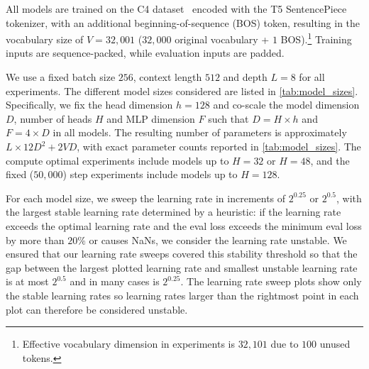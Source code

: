 All models are trained on the C4 dataset~\citep{t5} encoded with the T5 SentencePiece~\citep{kudo2018sentencepiece} tokenizer, with an additional beginning-of-sequence (BOS) token, resulting in the vocabulary size of $V = 32,001$ ($32,000$ original vocabulary + $1$ BOS).\footnote{Effective vocabulary dimension in experiments is $32,101$ due to $100$ unused tokens.} Training inputs are sequence-packed, while evaluation inputs are padded.

We use a fixed batch size $256$, context length $512$ and depth $L=8$ for all experiments. The different model sizes considered are listed in \cref{tab:model_sizes}. Specifically, we fix the head dimension $h=128$ and co-scale the model dimension $D$, number of heads $H$ and MLP dimension $F$ such that $D = H \times h$ and $F = 4 \times D$ in all models. The resulting number of parameters is approximately $L\times 12 D^2 + 2 V D$, with exact parameter counts reported in \cref{tab:model_sizes}. The compute optimal experiments include models up to $H=32$ or $H=48$, and the fixed ($50{,}000$) step experiments include models up to $H=128$.

For each model size, we sweep the learning rate in increments of $2^{0.25}$ or $2^{0.5}$, with the largest stable learning rate determined by a heuristic: if the learning rate exceeds the optimal learning rate and the eval loss exceeds the minimum eval loss by more than $20\%$ or causes NaNs, we consider the learning rate unstable. We ensured that our learning rate sweeps covered this stability threshold so that the gap between the largest plotted learning rate and smallest unstable learning rate is at most $2^{0.5}$ and in many cases is $2^{0.25}$. The learning rate sweep plots show only the stable learning rates so learning rates larger than the rightmost point in each plot can therefore be considered unstable.

